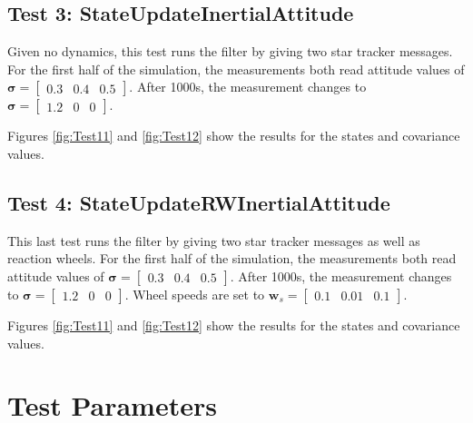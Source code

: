 \subsection{Test 3: StateUpdateInertialAttitude}

Given no dynamics, this test runs the filter by giving two star tracker messages. For the first half of the simulation, the measurements both read attitude values of $\bm \sigma =  \begin{bmatrix} 0.3 & 0.4 & 0.5 \end{bmatrix}$. After 1000s, the measurement changes to $\bm \sigma = \begin{bmatrix} 1.2 & 0 & 0 \end{bmatrix}$.

Figures \ref{fig:Test11} and \ref{fig:Test12} show the results for the states and covariance values.
 
 

\subsection{Test 4: StateUpdateRWInertialAttitude}

This last test runs the filter by giving two star tracker messages as well as reaction wheels. For the first half of the simulation, the measurements both read attitude values of $\bm \sigma = \begin{bmatrix} 0.3 & 0.4 & 0.5 \end{bmatrix}$. After 1000s, the measurement changes to $\bm \sigma = \begin{bmatrix} 1.2 & 0 & 0 \end{bmatrix}$. Wheel speeds are set to $\bm w_s = \begin{bmatrix} 0.1& 0.01& 0.1\end{bmatrix}$.

Figures \ref{fig:Test11} and \ref{fig:Test12} show the results for the states and covariance values.
 
 

\section{Test Parameters}

